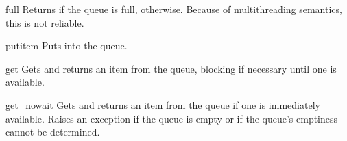 \begin{methoddesc}{full}{}
Returns  if the queue is full,  otherwise.  Because of
multithreading semantics, this is not reliable.
\end{methoddesc}

\begin{methoddesc}{put}{item}
Puts  into the queue.
\end{methoddesc}

\begin{methoddesc}{get}{}
Gets and returns an item from the queue, blocking if necessary until
one is available.
\end{methoddesc}

\begin{methoddesc}{get_nowait}{}
Gets and returns an item from the queue if one is immediately
available.  Raises an  exception if the queue is
empty or if the queue's emptiness cannot be determined.
\end{methoddesc}
